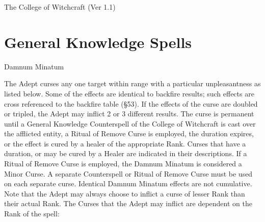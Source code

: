 \begin{Chapter}{The College of Witchcraft (Ver 1.1)}
\section{General Knowledge Spells}

\begin{spell}[G-1]{Damnum Minatum}

\begin{effects}
The Adept curses any one target within range with a particular
unpleasantness as listed below. Some of the effects are identical to
backfire results; such effects are cross referenced to the backfire
table (§53).  If the effects of the curse are doubled or tripled, the
Adept may inflict 2 or 3 different results.  The curse is permanent
until a General Knowledge Counterspell of the College of Witchcraft is
cast over the afflicted entity, a Ritual of Remove Curse is employed,
the duration expires, or the effect is cured by a healer of the
appropriate Rank. Curses that have a duration, or may be cured by a
Healer are indicated in their descriptions. If a Ritual of Remove
Curse is employed, the Damnum Minatum is considered a Minor Curse.  A
separate Counterspell or Ritual of Remove Curse must be used on each
separate curse.  Identical Damnum Minatum effects are not cumulative.
Note that the Adept may always choose to inflict a curse of lesser
Rank than their actual Rank.  The Curses that the Adept may inflict
are dependent on the Rank of the spell:


\end{effects}
\end{spell}
\end{Chapter}
